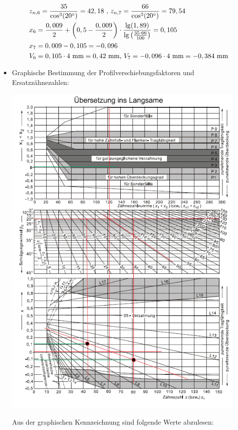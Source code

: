 \begin{itemize}
\begin{align*}
	&z_{n,6} = \frac{35}{\cos^3(20^\circ)} = 42,18 \text{ , }z_{n,7} = \frac{66}{\cos^3(20^\circ)} = 79,54 \\
	&x_6 =\frac{0,009}{2} + \left( 0,5 - \frac{0,009}{2} \right) \cdot \frac{\lg(1,89)}{\lg\left( \frac{35 \cdot 66}{100} \right)} = 0,105 \\
	&x_7 = 0,009 - 0,105 = - 0,096 \\ 
	&V_6 = 0,105 \cdot 4 \text{ mm} = 0,42 \text{ mm, }V_7 = -0,096\cdot 4 \text{ mm} = -0,384 \text{ mm} 
	\end{align*}
\newpage
\item Graphische Bestimmung der Profilverschiebungsfaktoren und Ersatzzähnezahlen:
	\begin{center}
		\includegraphics[width=0.95\textwidth,keepaspectratio]{figures/Profilverschiebung67.png}
	\end{center}
Aus der graphischen Kennzeichnung sind folgende Werte abzulesen:
\begin{align*}

\end{align*}
\end{itemize}
